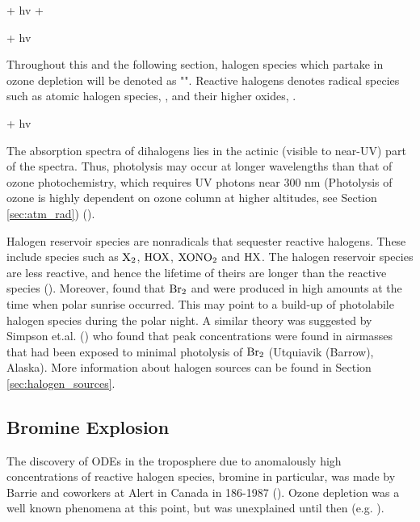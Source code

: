 \begin{reaction}
     + hv \rightarrow {} + 
    \label{R:19}
\end{reaction}

\begin{reaction}
     + hv 
\end{reaction}

Throughout this and the following section, halogen species which partake in ozone depletion will be denoted as "". Reactive halogens denotes radical species such as atomic halogen species, , and their higher oxides, . 

\begin{reaction}
     + hv  \label{R:1}
\end{reaction}

The absorption spectra of dihalogens lies in the actinic (visible to near-UV) part of the spectra. Thus, photolysis may occur at longer wavelengths than that of ozone photochemistry, which requires UV photons near 300 nm (Photolysis of ozone is highly dependent on ozone column at higher altitudes, see Section \ref{sec:atm_rad}) (\cite{Simpson2015}).

\medskip

Halogen reservoir species are nonradicals that sequester reactive halogens. These include species such as $\mathrm{X_2}$, $\mathrm{HOX}$, $\mathrm{XONO_2}$ and $\mathrm{HX}$. The halogen reservoir species are less reactive, and hence the lifetime of theirs are longer than the reactive species (\cite{Simpson2015}). Moreover, \cite{Foster2001} found that $\mathrm{Br_2}$ and  were produced in high amounts at the time when polar sunrise occurred. This may point to a build-up of photolabile halogen species during the polar night. A similar theory was suggested by Simpson et.al. (\cite{Simpson2018}) who found that peak  concentrations were found in airmasses that had been exposed to minimal photolysis of $\mathrm{Br_2}$ (Utquiavik (Barrow), Alaska). More information about halogen sources can be found in Section \ref{sec:halogen_sources}. 



\subsection{Bromine Explosion}\label{sec:BE}

The discovery of ODEs in the troposphere due to anomalously high concentrations of reactive halogen species, bromine in particular, was made by Barrie and coworkers at Alert in Canada in 186-1987 (\cite{BARRIE1986643}). Ozone depletion was a well known phenomena at this point, but was unexplained until then (e.g. \cite{Oltmans1981}). 

